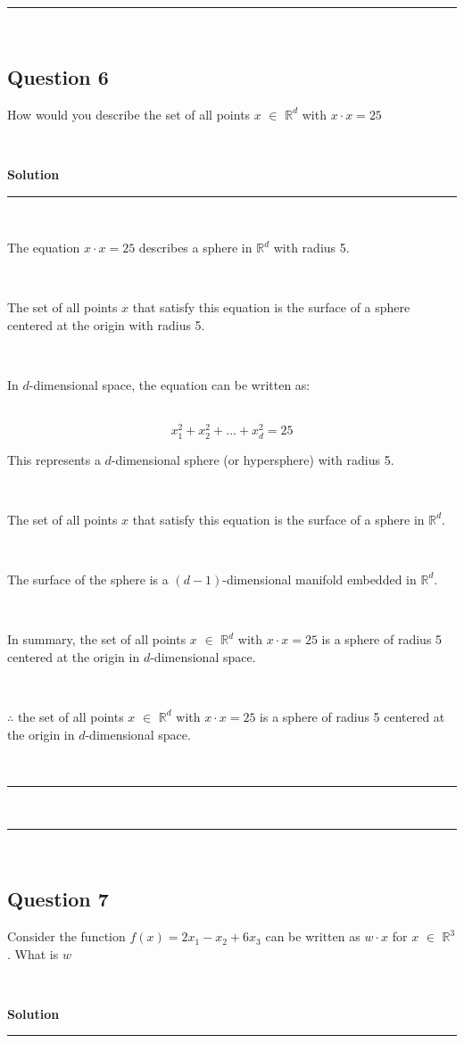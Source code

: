 \documentclass{article}
\begin{document}
\noindent\rule{\textwidth}{0.4pt}\\

\newpage
\subsection*{Question 6}
\parbox{\textwidth}{How would you describe the set of all points $x$ $\in$ $\mathbb{R}^d$ with $x \cdot x =25$}\\
\parbox{\textwidth}{\textbf{Solution}}
\noindent\rule{\textwidth}{0.4pt}\\
\parbox{\textwidth}{The equation $x \cdot x = 25$ describes a sphere in $\mathbb{R}^d$ with radius 5.}\\
\parbox{\textwidth}{The set of all points $x$ that satisfy this equation is the surface of a sphere centered at the origin with radius 5.}\\
\parbox{\textwidth}{In $d$-dimensional space, the equation can be written as:}\\
$$x_1^2 + x_2^2 + \ldots + x_d^2 = 25$$
\parbox{\textwidth}{This represents a $d$-dimensional sphere (or hypersphere) with radius 5.}\\
\parbox{\textwidth}{The set of all points $x$ that satisfy this equation is the surface of a sphere in $\mathbb{R}^d$.}\\
\parbox{\textwidth}{The surface of the sphere is a $(d-1)$-dimensional manifold embedded in $\mathbb{R}^d$.}\\
\parbox{\textwidth}{In summary, the set of all points $x$ $\in$ $\mathbb{R}^d$ with $x \cdot x = 25$ is a sphere of radius 5 centered at the origin in $d$-dimensional space.}\\
\parbox{\textwidth}{$\therefore$ the set of all points $x$ $\in$ $\mathbb{R}^d$ with $x \cdot x = 25$ is a sphere of radius 5 centered at the origin in $d$-dimensional space.}\\
\noindent\rule{\textwidth}{0.4pt}\\
\noindent\rule{\textwidth}{0.4pt}\\

\newpage
\subsection*{Question 7}
\parbox{\textwidth}{Consider the function $f(x) = 2x_1 -x_2+6x_3$ can be written as $w \cdot x$ for $x$ $\in$ $\mathbb{R}^3$. What is $w$}\\
\parbox{\textwidth}{\textbf{Solution}}
\noindent\rule{\textwidth}{0.4pt}\\
\end{document}
